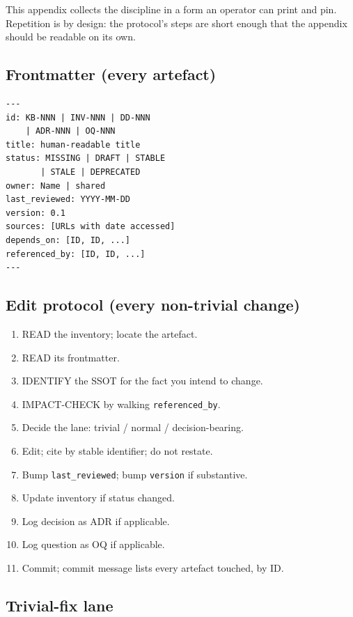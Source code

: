 \documentclass[11pt,a4paper,twocolumn]{article}
\begin{document}
This appendix collects the discipline in a form an operator can
print and pin. Repetition is by design: the protocol's steps are
short enough that the appendix should be readable on its own.

\subsection*{Frontmatter (every artefact)}

\begin{verbatim}
---
id: KB-NNN | INV-NNN | DD-NNN
    | ADR-NNN | OQ-NNN
title: human-readable title
status: MISSING | DRAFT | STABLE
       | STALE | DEPRECATED
owner: Name | shared
last_reviewed: YYYY-MM-DD
version: 0.1
sources: [URLs with date accessed]
depends_on: [ID, ID, ...]
referenced_by: [ID, ID, ...]
---
\end{verbatim}

\subsection*{Edit protocol (every non-trivial change)}

\begin{enumerate}[nosep,leftmargin=1.2em]
\item READ the inventory; locate the artefact.
\item READ its frontmatter.
\item IDENTIFY the SSOT for the fact you intend to change.
\item IMPACT-CHECK by walking \texttt{referenced\_by}.
\item Decide the lane: trivial / normal / decision-bearing.
\item Edit; cite by stable identifier; do not restate.
\item Bump \texttt{last\_reviewed}; bump \texttt{version} if substantive.
\item Update inventory if status changed.
\item Log decision as ADR if applicable.
\item Log question as OQ if applicable.
\item Commit; commit message lists every artefact touched, by ID.
\end{enumerate}

\subsection*{Trivial-fix lane}
\end{document}
